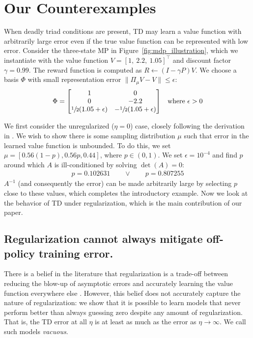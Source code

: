 \section{Our Counterexamples}\label{sec:introduce_example}
When deadly triad conditions are present, TD may learn a value function with arbitrarily large error even if the true value function can be represented with low error.
Consider the three-state MP in Figure~\ref{fig:mdp_illustration}, which we instantiate with the value function $V = [1,~2.2,~1.05]^\top$ and discount factor $\gamma = 0.99$. The reward function is computed as $R \gets (I-\gamma P)V$. We choose a basis $\Phi$ with small representation error $\|\Pi_\mu V - V\| \leq \epsilon$:
\begin{align}
  \Phi & = \begin{bmatrix}
             1                              & 0                               \\
             0                              & -2.2                            \\
             \sfrac{1}{2} (1.05 + \epsilon) & -\sfrac{1}{2} (1.05 + \epsilon) \\
           \end{bmatrix} & \text{where $\epsilon > 0$}
\end{align}

We first consider the unregularized ($\eta=0$) case, closely following the derivation in \cite{kolter2011fixed}. We wish to show there is some sampling distribution $\mu$ such that error in the learned value function is unbounded. To do this, we set $\mu=[0.56(1-p), 0.56p, 0.44]$, where $p \in (0, 1)$. We set $\epsilon=10^{-4}$ and find $p$ around which $A$ is ill-conditioned by solving $\det(A) = 0$:
\begin{align}
  p = 0.102631 \qquad \lor \qquad p = 0.807255
\end{align}
$A^{-1}$ (and consequently the error) can be made arbitrarily large by selecting $p$ close to these values, which completes the introductory example. Now we look at the behavior of TD under regularization, which is the main contribution of our paper.


\subsection{Regularization cannot always mitigate off-policy training error. }\label{sec:rrplotexplained}
There is a belief in the literature that regularization is a trade-off between reducing the blow-up of asymptotic errors and accurately learning the value function everywhere else \cite{diddigi2019convergent,zhang2021breaking}.
However, this belief does not accurately capture the nature of regularization: we show that it is possible to learn models that never perform better than always guessing zero despite any amount of regularization. That is, the TD error at all $\eta$ is at least as much as the error as $\eta\to\infty$. We call such models \emph{vacuous}.

